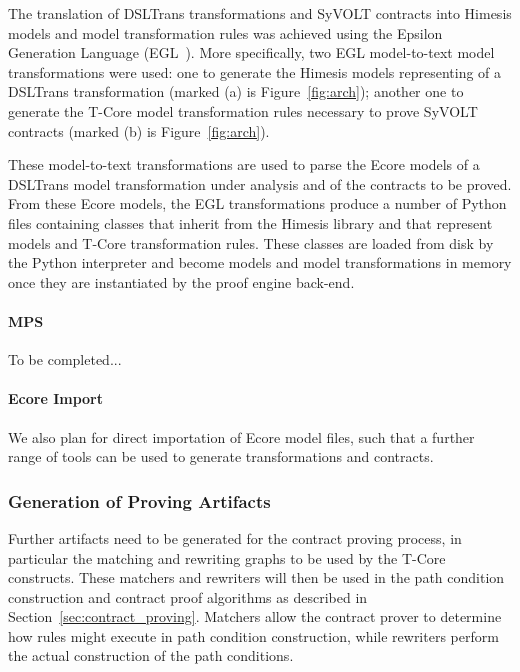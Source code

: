 The translation of DSLTrans transformations and SyVOLT contracts into Himesis
models and model transformation rules was achieved using the Epsilon Generation
Language (EGL~\cite{Rose2008}). More specifically, two EGL model-to-text model
transformations were used: one to generate the Himesis models representing of a DSLTrans transformation (marked (a) is
Figure~\ref{fig:arch}); another one to generate the T-Core model transformation
rules necessary to prove SyVOLT contracts (marked (b) is Figure~\ref{fig:arch}).

These model-to-text transformations are used to parse the Ecore models of a
DSLTrans model transformation under analysis and of the contracts to be proved.
From these Ecore models, the EGL transformations produce a number of Python
files containing classes that inherit from the Himesis library and that
represent models and T-Core transformation rules. These classes are loaded from
disk by the Python interpreter and become models and model transformations in
memory once they are instantiated by the proof engine back-end.


\paragraph{MPS}

To be completed...

\paragraph{Ecore Import}

We also plan for direct importation of Ecore model files, such that a further range of tools can be used to generate transformations and contracts.


\subsubsection{Generation of Proving Artifacts}

Further artifacts need to be generated for the contract proving process, in particular the matching and rewriting graphs to be used by the T-Core constructs. These matchers and rewriters will then be used in the path condition construction and contract proof algorithms as described in Section~\ref{sec:contract_proving}. Matchers allow the
contract prover to determine how rules might execute in path condition construction, while rewriters perform the actual construction of the path conditions.

